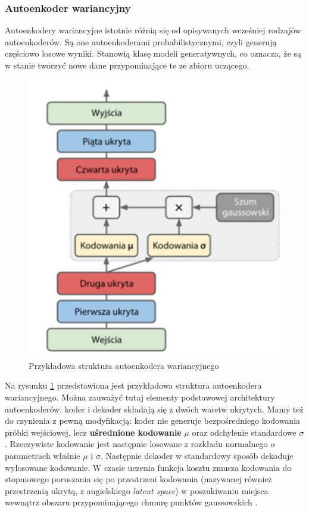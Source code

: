 \documentclass[12pt]{mwbk}
\theoremstyle{plain}
\theoremstyle{definition}
\theoremstyle{remark}
\newcommand\zrodlo[1]{\par\vspace{-3mm}{\small\textit{Źródło: }#1 }}
\begin{document}
\newpage

\subsubsection{Autoenkoder wariancyjny}

Autoenkodery wariancyjne istotnie różnią się od opisywanych wcześniej rodzajów autoenkoderów. Są one autoenkoderami probabilistycznymi, czyli generują częściowo losowe wyniki. Stanowią klasę modeli generatywnych, co oznacza, że są w stanie tworzyć nowe dane przypominające te ze zbioru uczącego. 




\begin{figure}[!h]
	\centering
	\includegraphics[width=0.5\linewidth]{rys/vae_structure.png}
	\caption{Przykładowa struktura autoenkodera wariancyjnego}
	\zrodlo{\cite{geron}}
	\label{fig:autoenkoder-wariancyjny}
\end{figure}


Na rysunku \ref{fig:autoenkoder-wariancyjny} przedstawiona jest przykładowa struktura autoenkodera wariancyjnego. Można zauważyć tutaj elementy podstawowej architektury autoenkoderów: koder i dekoder składają się z dwóch warstw ukrytych. Mamy też do czynienia z pewną modyfikacją: koder nie generuje bezpośredniego kodowania próbki wejściowej, lecz \textbf{uśrednione kodowanie} $\mu$ oraz odchylenie standardowe $\sigma$. Rzeczywiste kodowanie jest następnie losowane z rozkładu normalnego o parametrach właśnie $\mu$ i $\sigma$. Następnie dekoder w standardowy sposób dekoduje wylosowane kodowanie. W czasie uczenia funkcja kosztu zmusza kodowania do stopniowego poruszania się po przestrzeni kodowania (nazywanej również przestrzenią ukrytą, z angielskiego \emph{latent space}) w poszukiwaniu miejsca wewnątrz obszaru przypominającego chmurę punktów gaussowskich \cite{geron}.
\end{document}
